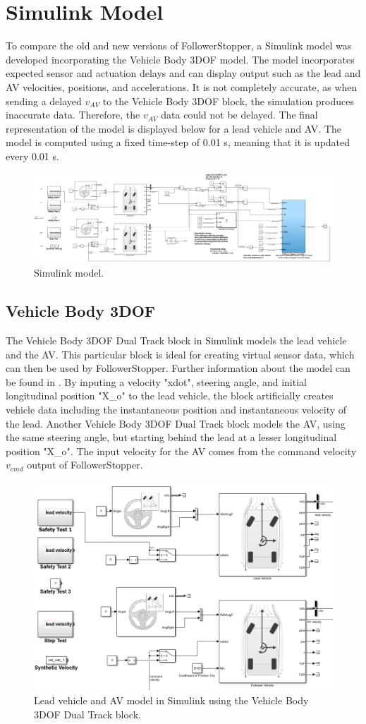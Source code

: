 \documentclass[conference]{IEEEtran}
\begin{document}
\section{Simulink Model}
To compare the old and new versions of FollowerStopper, a Simulink model was developed incorporating the Vehicle Body 3DOF model. The model incorporates expected sensor and actuation delays and can display output such as the lead and AV velocities, positions, and accelerations. It is not completely accurate, as when sending a delayed $v_{AV}$ to the Vehicle Body 3DOF block, the simulation produces inaccurate data. Therefore, the $v_{AV}$ data could not be delayed. The final representation of the model is displayed below for a lead vehicle and AV. The model is computed using a fixed time-step of 0.01 s, meaning that it is updated every 0.01 s.

\begin{figure}[htbp]
\centerline{\includegraphics[width=3.5 in]{simulink_model.png}}
\caption{Simulink model.}
\label{fig2}
\end{figure}

\subsection{Vehicle Body 3DOF}
The Vehicle Body 3DOF Dual Track block in Simulink models the lead vehicle and the AV. This particular block is ideal for creating virtual sensor data, which can then be used by FollowerStopper. Further information about the model can be found in \cite{vehicledynamicsblockset}. By inputing a velocity "xdot", steering angle, and initial longitudinal position "X\_o" to the lead vehicle, the block artificially creates vehicle data including the instantaneous position and instantaneous velocity of the lead. Another Vehicle Body 3DOF Dual Track block models the AV, using the same steering angle, but starting behind the lead at a lesser longitudinal position "X\_o". The input velocity for the AV comes from the command velocity $v_{cmd}$ output of FollowerStopper.

\begin{figure}[htbp]
\centerline{\includegraphics[width=3.5 in]{vehicle_body_3dof.png}}
\caption{Lead vehicle and AV model in Simulink using the Vehicle Body 3DOF Dual Track block.}
\label{fig2}
\end{figure}
\end{document}
